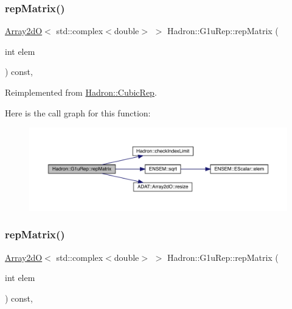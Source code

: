 \subsubsection{\texorpdfstring{repMatrix()}{repMatrix()}\hspace{0.1cm}{\footnotesize\ttfamily [2/3]}}
{\footnotesize\ttfamily \mbox{\hyperlink{classADAT_1_1Array2dO}{Array2dO}}$<$ std\+::complex$<$double$>$ $>$ Hadron\+::\+G1u\+Rep\+::rep\+Matrix (\begin{DoxyParamCaption}\item[{int}]{elem }\end{DoxyParamCaption}) const\hspace{0.3cm}{\ttfamily [inline]}, {\ttfamily [virtual]}}



Reimplemented from \mbox{\hyperlink{structHadron_1_1CubicRep_ac5d7e9e6f4ab1158b5fce3e4ad9e8005}{Hadron\+::\+Cubic\+Rep}}.

Here is the call graph for this function\+:
\nopagebreak
\begin{figure}[H]
\begin{center}
\leavevmode
\includegraphics[width=350pt]{d8/d42/structHadron_1_1G1uRep_a0f295ec0cd03014d647fa952f2c67676_cgraph}
\end{center}
\end{figure}
\mbox{\label{structHadron_1_1G1uRep_a0f295ec0cd03014d647fa952f2c67676}} 
\subsubsection{\texorpdfstring{repMatrix()}{repMatrix()}\hspace{0.1cm}{\footnotesize\ttfamily [3/3]}}
{\footnotesize\ttfamily \mbox{\hyperlink{classADAT_1_1Array2dO}{Array2dO}}$<$ std\+::complex$<$double$>$ $>$ Hadron\+::\+G1u\+Rep\+::rep\+Matrix (\begin{DoxyParamCaption}\item[{int}]{elem }\end{DoxyParamCaption}) const\hspace{0.3cm}{\ttfamily [inline]}, {\ttfamily [virtual]}}



